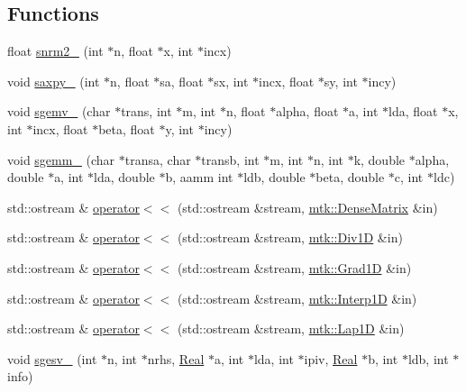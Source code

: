 \subsection*{Functions}
\begin{DoxyCompactItemize}
\item 
float \hyperlink{namespacemtk_a508e99fcb14d526bc43aa0a80aa4b658}{snrm2\+\_\+} (int $\ast$n, float $\ast$x, int $\ast$incx)
\item 
void \hyperlink{namespacemtk_a81a2d7d1ea9eff65ae13646c93dad5e9}{saxpy\+\_\+} (int $\ast$n, float $\ast$sa, float $\ast$sx, int $\ast$incx, float $\ast$sy, int $\ast$incy)
\item 
void \hyperlink{namespacemtk_a88daff7ad6f251a58b94aa2d0c94d069}{sgemv\+\_\+} (char $\ast$trans, int $\ast$m, int $\ast$n, float $\ast$alpha, float $\ast$a, int $\ast$lda, float $\ast$x, int $\ast$incx, float $\ast$beta, float $\ast$y, int $\ast$incy)
\item 
void \hyperlink{namespacemtk_adb7c0560326b8e57f255e58b87ec76b0}{sgemm\+\_\+} (char $\ast$transa, char $\ast$transb, int $\ast$m, int $\ast$n, int $\ast$k, double $\ast$alpha, double $\ast$a, int $\ast$lda, double $\ast$b, aamm int $\ast$ldb, double $\ast$beta, double $\ast$c, int $\ast$ldc)
\item 
std\+::ostream \& \hyperlink{namespacemtk_ad3bcf52cda59ddb5fc7b4bdce76c46dc}{operator$<$$<$} (std\+::ostream \&stream, \hyperlink{classmtk_1_1DenseMatrix}{mtk\+::\+Dense\+Matrix} \&in)
\item 
std\+::ostream \& \hyperlink{namespacemtk_a12db5e6fff3788f728819a60d5c28d01}{operator$<$$<$} (std\+::ostream \&stream, \hyperlink{classmtk_1_1Div1D}{mtk\+::\+Div1\+D} \&in)
\item 
std\+::ostream \& \hyperlink{namespacemtk_a3f546b8a3743b8719db17e33f2d7ef7f}{operator$<$$<$} (std\+::ostream \&stream, \hyperlink{classmtk_1_1Grad1D}{mtk\+::\+Grad1\+D} \&in)
\item 
std\+::ostream \& \hyperlink{namespacemtk_a1defe4e644a8c7d89bcceb0b1bc2372f}{operator$<$$<$} (std\+::ostream \&stream, \hyperlink{classmtk_1_1Interp1D}{mtk\+::\+Interp1\+D} \&in)
\item 
std\+::ostream \& \hyperlink{namespacemtk_af667c01a388ef1815d549b09b2d76bcc}{operator$<$$<$} (std\+::ostream \&stream, \hyperlink{classmtk_1_1Lap1D}{mtk\+::\+Lap1\+D} \&in)
\item 
void \hyperlink{namespacemtk_ae1d63c7ae73b3c48e0dca81eb19039f3}{sgesv\+\_\+} (int $\ast$n, int $\ast$nrhs, \hyperlink{group__c01-roots_gac080bbbf5cbb5502c9f00405f894857d}{Real} $\ast$a, int $\ast$lda, int $\ast$ipiv, \hyperlink{group__c01-roots_gac080bbbf5cbb5502c9f00405f894857d}{Real} $\ast$b, int $\ast$ldb, int $\ast$info)

\end{DoxyCompactItemize}
